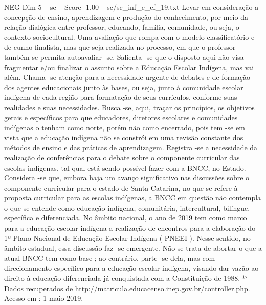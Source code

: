 \begin{textsample}{NEG Dim 5 – sc – Score -1.00 – sc/sc\_inf\_e\_ef\_19.txt}
Levar em consideração a concepção de ensino, aprendizagem e produção do conhecimento, por meio da relação dialógica entre professor, educando, família, comunidade, ou seja, o contexto sociocultural.
Uma avaliação que rompa com o modelo classificatório e de cunho finalista, mas que seja realizada no processo, em que o professor também se permita autoavaliar -se.
Salienta -se que o disposto aqui não visa fragmentar e/ou finalizar o assunto sobre a Educação Escolar Indígena, mas vai além.
Chama -se atenção para a necessidade urgente de debates e de formação dos agentes educacionais junto às bases, ou seja, junto à comunidade escolar indígena de cada região para formatação de seus currículos, conforme suas realidades e suas necessidades.
Busca -se, aqui, traçar os princípios, os objetivos gerais e específicos para que educadores, diretores escolares e comunidades indígenas o tenham como norte, porém não como encerrado, pois tem -se em vista que a educação indígena não se constrói em uma revisão constante dos métodos de ensino e das práticas de aprendizagem.
Registra -se a necessidade da realização de conferências para o debate sobre o componente curricular das escolas indígenas, tal qual está sendo possível fazer com a BNCC, no Estado.
Considera -se que, embora haja um avanço significativo nas discussões sobre o componente curricular para o estado de Santa Catarina, no que se refere à proposta curricular para as escolas indígenas, a BNCC em questão não contempla o que se entende como educação indígena, comunitária, intercultural, bilíngue, específica e diferenciada.
No âmbito nacional, o ano de 2019 tem como marco para a educação escolar indígena a realização de encontros para a elaboração do 1º Plano Nacional de Educação Escolar Indígena ( PNEEI ).
Nesse sentido, no âmbito estadual, essa discussão faz -se emergente.
Não se trata de abortar o que a atual BNCC tem como base ; ao contrário, parte -se dela, mas com direcionamento específico para a educação escolar indígena, visando dar vazão ao direito à educação diferenciada já conquistada com a Constituição de 1988. ¹⁷ Dados recuperados de http://matricula.educacenso.inep.gov.br/controller.php.
Acesso em : 1 maio 2019.

\end{textsample}
